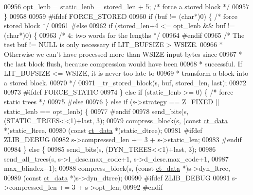 \begin{DoxyCode}
{{{{{{{{{{{{{{{{{{{{{00956         opt\_lenb = static\_lenb = stored\_len + 5; \textcolor{comment}{/* force a stored block */}
00957     \}
00958 
00959 \textcolor{preprocessor}{#ifdef FORCE\_STORED}
00960     \textcolor{keywordflow}{if} (buf != (\textcolor{keywordtype}{char}*)0) \{ \textcolor{comment}{/* force stored block */}
00961 \textcolor{preprocessor}{#else}
00962     \textcolor{keywordflow}{if} (stored\_len+4 <= opt\_lenb && buf != (\textcolor{keywordtype}{char}*)0) \{
00963                        \textcolor{comment}{/* 4: two words for the lengths */}
00964 \textcolor{preprocessor}{#endif}
00965         \textcolor{comment}{/* The test buf != NULL is only necessary if LIT\_BUFSIZE > WSIZE.}
00966 \textcolor{comment}{         * Otherwise we can't have processed more than WSIZE input bytes since}
00967 \textcolor{comment}{         * the last block flush, because compression would have been}
00968 \textcolor{comment}{         * successful. If LIT\_BUFSIZE <= WSIZE, it is never too late to}
00969 \textcolor{comment}{         * transform a block into a stored block.}
00970 \textcolor{comment}{         */}
00971         \_tr\_stored\_block(s, buf, stored\_len, last);
00972 
00973 \textcolor{preprocessor}{#ifdef FORCE\_STATIC}
00974     \} \textcolor{keywordflow}{else} \textcolor{keywordflow}{if} (static\_lenb >= 0) \{ \textcolor{comment}{/* force static trees */}
00975 \textcolor{preprocessor}{#else}
00976     \} \textcolor{keywordflow}{else} \textcolor{keywordflow}{if} (s->strategy == Z\_FIXED || static\_lenb == opt\_lenb) \{
00977 \textcolor{preprocessor}{#endif}
00978         send\_bits(s, (STATIC\_TREES<<1)+last, 3);
00979         compress\_block(s, (\textcolor{keyword}{const} \hyperlink{structct__data__s}{ct\_data} *)static\_ltree,
00980                        (\textcolor{keyword}{const} \hyperlink{structct__data__s}{ct\_data} *)static\_dtree);
00981 \textcolor{preprocessor}{#ifdef ZLIB\_DEBUG}
00982         s->compressed\_len += 3 + s->static\_len;
00983 \textcolor{preprocessor}{#endif}
00984     \} \textcolor{keywordflow}{else} \{
00985         send\_bits(s, (DYN\_TREES<<1)+last, 3);
00986         send\_all\_trees(s, s->l\_desc.max\_code+1, s->d\_desc.max\_code+1,
00987                        max\_blindex+1);
00988         compress\_block(s, (\textcolor{keyword}{const} \hyperlink{structct__data__s}{ct\_data} *)s->dyn\_ltree,
00989                        (\textcolor{keyword}{const} \hyperlink{structct__data__s}{ct\_data} *)s->dyn\_dtree);
00990 \textcolor{preprocessor}{#ifdef ZLIB\_DEBUG}
00991         s->compressed\_len += 3 + s->opt\_len;
00992 \textcolor{preprocessor}{#endif}
}}}}}}}}}}}}}}}}}}}}}
\end{DoxyCode}
